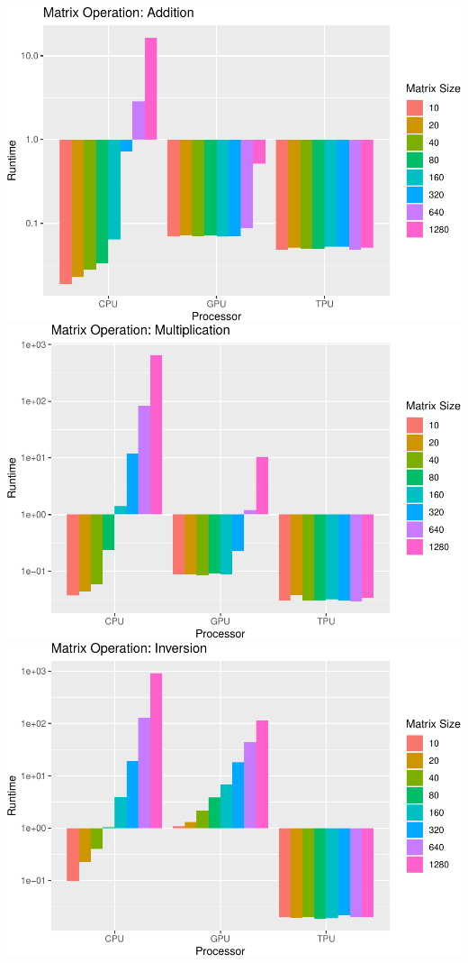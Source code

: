 \documentclass[
]{article}
\begin{document}
\includegraphics{main_files/figure-latex/unnamed-chunk-7-1.pdf}
\includegraphics{main_files/figure-latex/unnamed-chunk-7-2.pdf}
\includegraphics{main_files/figure-latex/unnamed-chunk-7-3.pdf}
\end{document}
